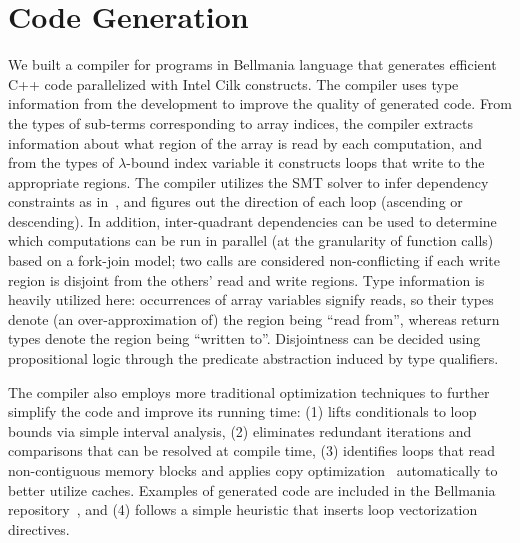 \section{Code Generation}
\label{codegen}

We built a compiler for programs in Bellmania language that generates efficient C++ code parallelized with Intel Cilk constructs. The compiler uses type information from the development to improve the
quality of generated code. From the types of sub-terms corresponding
to array indices, the compiler extracts information about what region
of the array is read by each computation, and from the types of $\lambda$-bound index variable it constructs loops that write to
the appropriate regions. The compiler utilizes the SMT solver to infer dependency constraints as in~\cite{JACM67/Karp},
and figures out the direction of each loop (ascending or descending). 
In addition, inter-quadrant dependencies can be used to determine which computations can be run in parallel (at the granularity of
function calls) based on a fork-join model;
two calls are considered non-conflicting if each write region is disjoint from the others' read and write regions.
\cbstart{}%
Type information is heavily utilized here: occurrences of array variables signify reads,
so their types denote (an over-approximation of) the region being ``read from'',
whereas return types denote the region being ``written to''.
Disjointness can be decided using propositional logic through the predicate abstraction induced by type qualifiers.
\cbend

The compiler also employs more traditional optimization techniques
to further simplify the code and improve its running time:
(1) lifts conditionals to loop bounds via simple interval analysis, %
(2) eliminates redundant iterations and comparisons that can be resolved at compile time,
(3) identifies loops that read non-contiguous memory blocks and applies copy optimization~\cite{ASPLOS91/Lam} automatically to better utilize caches. Examples of generated code are included in the Bellmania repository~\cite{bellmaniarepo},
and
\cbstart
(4) follows a simple heuristic that inserts loop vectorization directives.
\cbend
 

